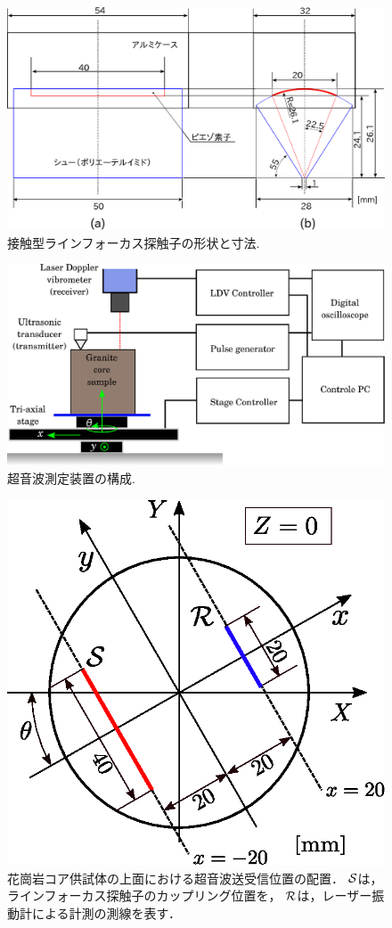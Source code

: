\begin{figure}[h]
	\begin{center}
	\includegraphics[width=0.8\linewidth]{Figs/fig2.eps} 
	\end{center}
	\caption{
		接触型ラインフォーカス探触子の形状と寸法.
	} 
	\label{fig:fig2}
\end{figure}
\begin{figure}[h]
	\begin{center}
	\includegraphics[width=0.8\linewidth]{Figs/fig3.eps} 
	\end{center}
	\caption{
		超音波測定装置の構成.
	} 
	\label{fig:fig3}
\end{figure}
\begin{figure}[h]
	\begin{center}
	\includegraphics[width=0.5\linewidth]{Figs/fig4.eps} 
	\end{center}
	\caption{
		花崗岩コア供試体の上面における超音波送受信位置の配置．
		${\cal S}$は，ラインフォーカス探触子のカップリング位置を，
		${\cal R}$は，レーザー振動計による計測の測線を表す．
	} 
	\label{fig:fig4}
\end{figure}
